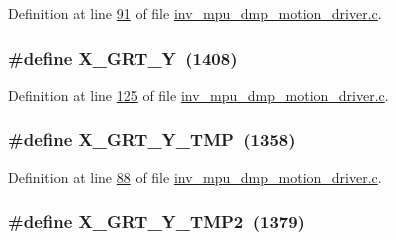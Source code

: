 Definition at line \hyperlink{inv__mpu__dmp__motion__driver_8c_source_l00091}{91} of file \hyperlink{inv__mpu__dmp__motion__driver_8c_source}{inv\+\_\+mpu\+\_\+dmp\+\_\+motion\+\_\+driver.\+c}.

\subsubsection[{\texorpdfstring{X\+\_\+\+G\+R\+T\+\_\+Y}{X_GRT_Y}}]{\setlength{\rightskip}{0pt plus 5cm}\#define X\+\_\+\+G\+R\+T\+\_\+Y~(1408)}\hypertarget{group___d_r_i_v_e_r_s_ga70e52e79b5774e056a86795a52e3b027}{}\label{group___d_r_i_v_e_r_s_ga70e52e79b5774e056a86795a52e3b027}


Definition at line \hyperlink{inv__mpu__dmp__motion__driver_8c_source_l00125}{125} of file \hyperlink{inv__mpu__dmp__motion__driver_8c_source}{inv\+\_\+mpu\+\_\+dmp\+\_\+motion\+\_\+driver.\+c}.

\subsubsection[{\texorpdfstring{X\+\_\+\+G\+R\+T\+\_\+\+Y\+\_\+\+T\+MP}{X_GRT_Y_TMP}}]{\setlength{\rightskip}{0pt plus 5cm}\#define X\+\_\+\+G\+R\+T\+\_\+\+Y\+\_\+\+T\+MP~(1358)}\hypertarget{group___d_r_i_v_e_r_s_ga0ff907b44d0e42641e71e6da41829090}{}\label{group___d_r_i_v_e_r_s_ga0ff907b44d0e42641e71e6da41829090}


Definition at line \hyperlink{inv__mpu__dmp__motion__driver_8c_source_l00088}{88} of file \hyperlink{inv__mpu__dmp__motion__driver_8c_source}{inv\+\_\+mpu\+\_\+dmp\+\_\+motion\+\_\+driver.\+c}.

\subsubsection[{\texorpdfstring{X\+\_\+\+G\+R\+T\+\_\+\+Y\+\_\+\+T\+M\+P2}{X_GRT_Y_TMP2}}]{\setlength{\rightskip}{0pt plus 5cm}\#define X\+\_\+\+G\+R\+T\+\_\+\+Y\+\_\+\+T\+M\+P2~(1379)}\hypertarget{group___d_r_i_v_e_r_s_ga193d85c2bd5dd9e43c1f89445e999ac6}{}\label{group___d_r_i_v_e_r_s_ga193d85c2bd5dd9e43c1f89445e999ac6}


